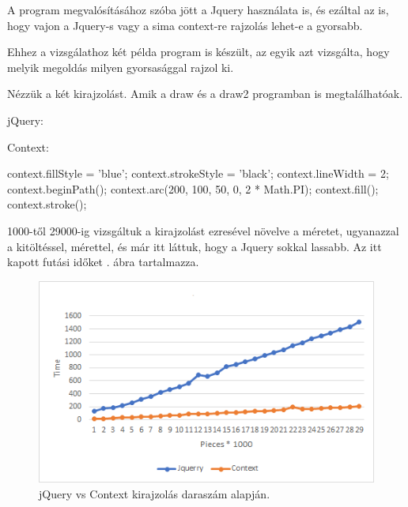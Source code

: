

A program megvalósításához szóba jött a Jquery használata is, és ezáltal az is, hogy vajon a Jquery-s vagy a sima context-re rajzolás lehet-e a gyorsabb.


Ehhez a vizsgálathoz két példa program is készült, az egyik azt vizsgálta, hogy melyik megoldás milyen gyorsasággal rajzol ki.

Nézzük a két kirajzolást. Amik a draw és a draw2 programban is megtalálhatóak.

\bigskip

\noindent jQuery:

\bigskip

\noindent Context:
\begin{java}
context.fillStyle = 'blue';
context.strokeStyle = 'black';
context.lineWidth = 2;
context.beginPath();
context.arc(200, 100, 50, 0, 2 * Math.PI);
context.fill();
context.stroke();
\end{java}

\medskip

1000-től 29000-ig vizsgáltuk a kirajzolást ezresével növelve a méretet, ugyanazzal a kitöltéssel, mérettel, és már itt láttuk, hogy a Jquery sokkal lassabb. Az itt kapott futási időket . ábra tartalmazza.

\begin{figure}[h]
	\centering
	\includegraphics[width=\textwidth]{images/pieces.png}
	\caption{jQuery vs Context kirajzolás daraszám alapján.}
	\label{fig:pieces}
\end{figure}

